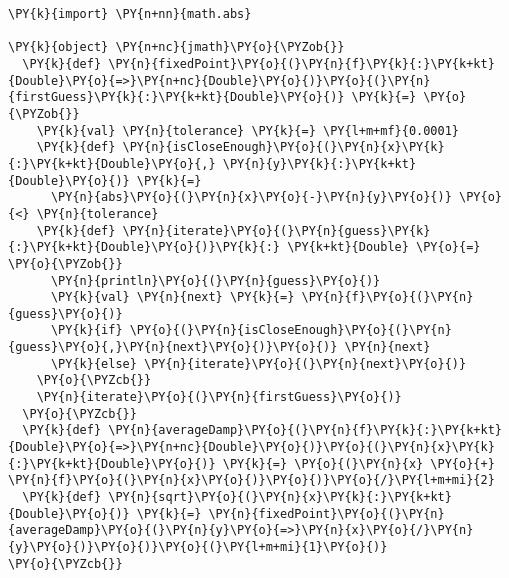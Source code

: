 \begin{Verbatim}[commandchars=\\\{\}]
\PY{k}{import} \PY{n+nn}{math.abs}

\PY{k}{object} \PY{n+nc}{jmath}\PY{o}{\PYZob{}}
  \PY{k}{def} \PY{n}{fixedPoint}\PY{o}{(}\PY{n}{f}\PY{k}{:}\PY{k+kt}{Double}\PY{o}{=>}\PY{n+nc}{Double}\PY{o}{)}\PY{o}{(}\PY{n}{firstGuess}\PY{k}{:}\PY{k+kt}{Double}\PY{o}{)} \PY{k}{=} \PY{o}{\PYZob{}}
    \PY{k}{val} \PY{n}{tolerance} \PY{k}{=} \PY{l+m+mf}{0.0001}
    \PY{k}{def} \PY{n}{isCloseEnough}\PY{o}{(}\PY{n}{x}\PY{k}{:}\PY{k+kt}{Double}\PY{o}{,} \PY{n}{y}\PY{k}{:}\PY{k+kt}{Double}\PY{o}{)} \PY{k}{=}
      \PY{n}{abs}\PY{o}{(}\PY{n}{x}\PY{o}{-}\PY{n}{y}\PY{o}{)} \PY{o}{<} \PY{n}{tolerance}
    \PY{k}{def} \PY{n}{iterate}\PY{o}{(}\PY{n}{guess}\PY{k}{:}\PY{k+kt}{Double}\PY{o}{)}\PY{k}{:} \PY{k+kt}{Double} \PY{o}{=} \PY{o}{\PYZob{}}
      \PY{n}{println}\PY{o}{(}\PY{n}{guess}\PY{o}{)}
      \PY{k}{val} \PY{n}{next} \PY{k}{=} \PY{n}{f}\PY{o}{(}\PY{n}{guess}\PY{o}{)} 
      \PY{k}{if} \PY{o}{(}\PY{n}{isCloseEnough}\PY{o}{(}\PY{n}{guess}\PY{o}{,}\PY{n}{next}\PY{o}{)}\PY{o}{)} \PY{n}{next}
      \PY{k}{else} \PY{n}{iterate}\PY{o}{(}\PY{n}{next}\PY{o}{)} 
    \PY{o}{\PYZcb{}}
    \PY{n}{iterate}\PY{o}{(}\PY{n}{firstGuess}\PY{o}{)}
  \PY{o}{\PYZcb{}}
  \PY{k}{def} \PY{n}{averageDamp}\PY{o}{(}\PY{n}{f}\PY{k}{:}\PY{k+kt}{Double}\PY{o}{=>}\PY{n+nc}{Double}\PY{o}{)}\PY{o}{(}\PY{n}{x}\PY{k}{:}\PY{k+kt}{Double}\PY{o}{)} \PY{k}{=} \PY{o}{(}\PY{n}{x} \PY{o}{+} \PY{n}{f}\PY{o}{(}\PY{n}{x}\PY{o}{)}\PY{o}{)}\PY{o}{/}\PY{l+m+mi}{2}
  \PY{k}{def} \PY{n}{sqrt}\PY{o}{(}\PY{n}{x}\PY{k}{:}\PY{k+kt}{Double}\PY{o}{)} \PY{k}{=} \PY{n}{fixedPoint}\PY{o}{(}\PY{n}{averageDamp}\PY{o}{(}\PY{n}{y}\PY{o}{=>}\PY{n}{x}\PY{o}{/}\PY{n}{y}\PY{o}{)}\PY{o}{)}\PY{o}{(}\PY{l+m+mi}{1}\PY{o}{)}
\PY{o}{\PYZcb{}}
\end{Verbatim}
